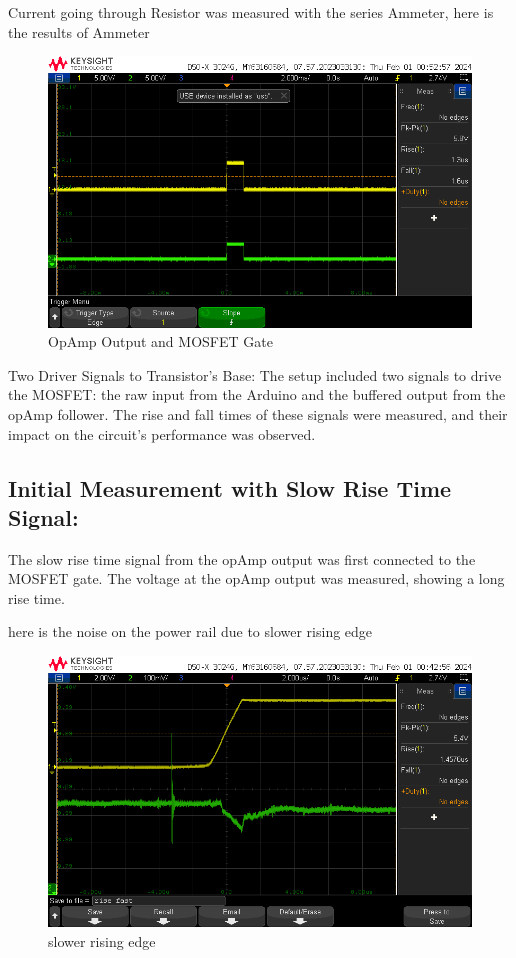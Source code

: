 \documentclass[a4paper,11pt]{article}%
\begin{document}
		Current going through Resistor was measured with the series Ammeter, here is the results of Ammeter


		\begin{figure}[H]
			\centering
			\includegraphics[scale=0.6]{figures/opo_fetin1.png}
			\caption{OpAmp Output and MOSFET Gate}
		\end{figure}

	
		Two Driver Signals to Transistor’s Base: The setup included two signals to drive the MOSFET: the raw input from the Arduino and the buffered output from the opAmp follower. The rise and fall times of these signals were measured, and their impact on the circuit's performance was observed.
	

	
		\subsection{Initial Measurement with Slow Rise Time Signal:}
		The slow rise time signal from the opAmp output was first connected to the MOSFET gate. The voltage at the opAmp output was measured, showing a long rise time.

		here is the noise on the power rail due to slower rising edge  
		\begin{figure}[H]
			\centering
			\includegraphics[scale=0.6]{figures/rise_slow.png}
			\caption{slower rising edge}
		\end{figure}
		
\end{document}
